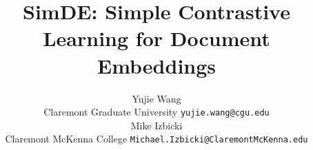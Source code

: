 \documentclass[11pt]{article}
\title{SimDE: Simple Contrastive Learning for Document Embeddings}
\author{Yujie Wang \\
  Claremont Graduate University 
  \texttt{yujie.wang@cgu.edu} \\\And
  Mike Izbicki \\
  Claremont McKenna College
  \texttt{Michael.Izbicki@ClaremontMcKenna.edu} \\}
\newcommand{\our}{\mbox{\textsc{SimDE}}}
\begin{document}
\maketitle
\begin{abstract}



\end{abstract}
\end{document}
